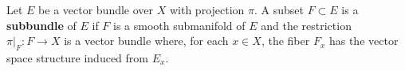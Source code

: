 Let $E$ be a vector bundle over $X$ with projection $\pi$. A subset $F \subset E$ is a \textbf{subbundle} of $E$ if $F$ is a smooth submanifold of $E$ and the restriction $\pi|_F: F \to X$ is a vector bundle where, for each $x \in X$, the fiber $F_x$ has the vector space structure induced from $E_x$.
